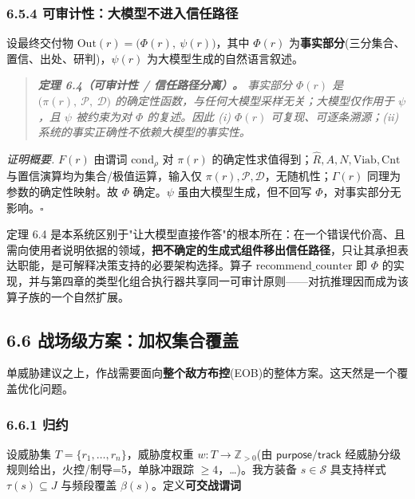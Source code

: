 \documentclass[12pt,a4paper]{ctexart}
\begin{document}
\subsubsection*{6.5.4 可审计性：大模型不进入信任路径}

设最终交付物 $\mathrm{Out}(r)=\big(\Phi(r),\ \psi(r)\big)$，其中 $\Phi(r)$ 为\textbf{事实部分}(三分集合、置信、出处、研判)，$\psi(r)$ 为大模型生成的自然语言叙述。

\begin{quote}\itshape \textbf{定理 6.4（可审计性 / 信任路径分离）。} 事实部分 $\Phi(r)$ 是 $\big(\pi(r),\ \mathcal{P},\ \mathcal{D}\big)$ 的确定性函数，与任何大模型采样无关；大模型仅作用于 $\psi$，且 $\psi$ 被约束为对 $\Phi$ 的复述。因此 (i) $\Phi(r)$ 可复现、可逐条溯源；(ii) 系统的事实正确性不依赖大模型的事实性。\end{quote}

\textit{证明概要.} $F(r)$ 由谓词 $\mathrm{cond}_\rho$ 对 $\pi(r)$ 的确定性求值得到；$\widehat R,A,N,\mathrm{Viab},\mathrm{Cnt}$ 与置信演算均为集合/极值运算，输入仅 $\pi(r),\mathcal P,\mathcal D$，无随机性；$\Gamma(r)$ 同理为参数的确定性映射。故 $\Phi$ 确定。$\psi$ 虽由大模型生成，但不回写 $\Phi$，对事实部分无影响。$\square$

定理 6.4 是本系统区别于"让大模型直接作答"的根本所在：在一个错误代价高、且需向使用者说明依据的领域，\textbf{把不确定的生成式组件移出信任路径}，只让其承担表达职能，是可解释决策支持的必要架构选择。算子 $\mathrm{recommend\_counter}$ 即 $\Phi$ 的实现，并与第四章的类型化组合执行器共享同一可审计原则——对抗推理因而成为该算子族的一个自然扩展。


\subsection*{6.6 战场级方案：加权集合覆盖}

单威胁建议之上，作战需要面向\textbf{整个敌方布控}(EOB)的整体方案。这天然是一个覆盖优化问题。

\subsubsection*{6.6.1 归约}

设威胁集 $T=\{r_1,\dots,r_n\}$，威胁度权重 $w:T\to\mathbb{Z}_{>0}$(由 $\mathsf{purpose}/\mathsf{track}$ 经威胁分级规则给出，火控/制导=5，单脉冲跟踪 $\ge 4$，…)。我方装备 $s\in\mathcal{S}$ 具支持样式 $\tau(s)\subseteq J$ 与频段覆盖 $\beta(s)$。定义\textbf{可交战谓词}
\end{document}
